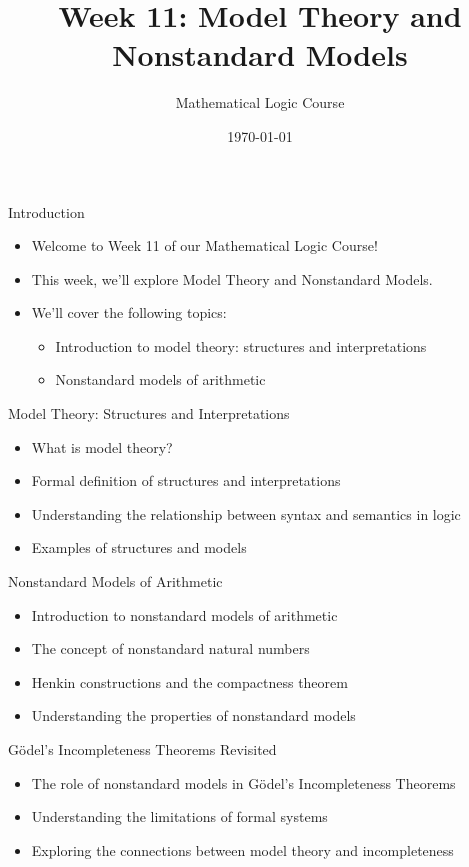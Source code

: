 \documentclass[presentation]{beamer}
\author{Mathematical Logic Course}
\date{\today}
\title{Week 11: Model Theory and Nonstandard Models}
\begin{document}
\maketitle

\begin{frame}[label={sec:org36ac1c9}]{Introduction}
\begin{itemize}
\item Welcome to Week 11 of our Mathematical Logic Course!
\item This week, we'll explore Model Theory and Nonstandard Models.
\item We'll cover the following topics:
\begin{itemize}
\item Introduction to model theory: structures and interpretations
\item Nonstandard models of arithmetic
\end{itemize}
\end{itemize}
\end{frame}

\begin{frame}[label={sec:org1b4d9b8}]{Model Theory: Structures and Interpretations}
\begin{itemize}
\item What is model theory?
\item Formal definition of structures and interpretations
\item Understanding the relationship between syntax and semantics in logic
\item Examples of structures and models
\end{itemize}
\end{frame}

\begin{frame}[label={sec:org7eb6787}]{Nonstandard Models of Arithmetic}
\begin{itemize}
\item Introduction to nonstandard models of arithmetic
\item The concept of nonstandard natural numbers
\item Henkin constructions and the compactness theorem
\item Understanding the properties of nonstandard models
\end{itemize}
\end{frame}

\begin{frame}[label={sec:org9da67e1}]{Gödel's Incompleteness Theorems Revisited}
\begin{itemize}
\item The role of nonstandard models in Gödel's Incompleteness Theorems
\item Understanding the limitations of formal systems
\item Exploring the connections between model theory and incompleteness
\end{itemize}
\end{frame}
\end{document}
